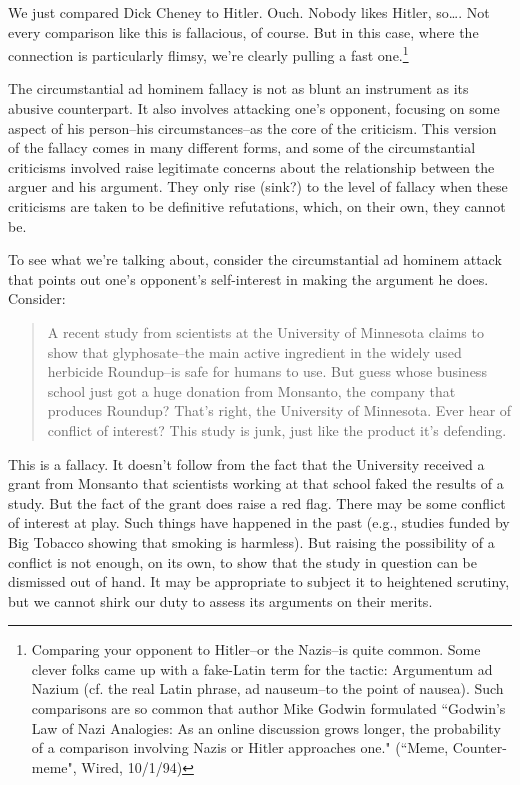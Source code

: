 We just compared Dick Cheney to Hitler. Ouch. Nobody likes Hitler, so…. Not every comparison
like this is fallacious, of course. But in this case, where the connection is particularly flimsy, we're
clearly pulling a fast one.\footnote{Comparing your opponent to Hitler--or the Nazis--is quite common. Some clever folks came up with a fake-Latin
term for the tactic: Argumentum ad Nazium (cf. the real Latin phrase, ad nauseum--to the point of nausea). Such
comparisons are so common that author Mike Godwin formulated ``Godwin's Law of Nazi Analogies: As an online
discussion grows longer, the probability of a comparison involving Nazis or Hitler approaches one." (``Meme,
Counter-meme", Wired, 10/1/94)}

The circumstantial ad hominem fallacy is not as blunt an instrument as its abusive counterpart. It
also involves attacking one's opponent, focusing on some aspect of his person--his
circumstances--as the core of the criticism. This version of the fallacy comes in many different
forms, and some of the circumstantial criticisms involved raise legitimate concerns about the
relationship between the arguer and his argument. They only rise (sink?) to the level of fallacy
when these criticisms are taken to be definitive refutations, which, on their own, they cannot be.

To see what we're talking about, consider the circumstantial ad hominem attack that points out
one's opponent's self-interest in making the argument he does. Consider:

\begin{quote}
A recent study from scientists at the University of Minnesota claims to show that
glyphosate--the main active ingredient in the widely used herbicide Roundup--is safe for
humans to use. But guess whose business school just got a huge donation from Monsanto,
the company that produces Roundup? That's right, the University of Minnesota. Ever hear
of conflict of interest? This study is junk, just like the product it's defending.
\end{quote}

This is a fallacy. It doesn't follow from the fact that the University received a grant from Monsanto
that scientists working at that school faked the results of a study. But the fact of the grant does
raise a red flag. There may be some conflict of interest at play. Such things have happened in the
past (e.g., studies funded by Big Tobacco showing that smoking is harmless). But raising the
possibility of a conflict is not enough, on its own, to show that the study in question can be
dismissed out of hand. It may be appropriate to subject it to heightened scrutiny, but we cannot
shirk our duty to assess its arguments on their merits.

